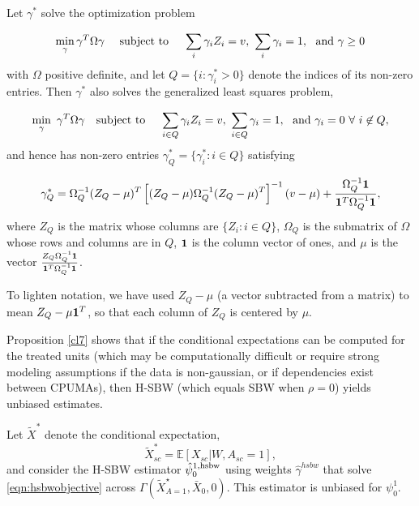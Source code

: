 \begin{proposition}\label{cl56}
Let $\gamma^*$ solve the optimization problem

\begin{equation}\label{eqn:a1.1}
 \min_\gamma \gamma^T \Omega \gamma \quad \text{ subject to } \quad  \sum_i \gamma_i Z_i = v,\ \sum_i \gamma_i = 1,\ \textup{ and } \gamma \geq 0%
\end{equation}
 with $\Omega$ positive definite, and let $Q = \{i: \gamma^*_i > 0\}$ denote the indices of its non-zero entries. Then $\gamma^*$ also solves the generalized least squares problem,
  
  \begin{equation}\label{eqn:a1.2}
   \min_{\gamma}  \ \gamma^T \Omega \gamma  \quad \textup{subject to }\quad \sum_{i \in Q} \gamma_i Z_i = v,\ \sum_{i \in Q} \gamma_i = 1,\ \textup{ and }   \gamma_i = 0\  \forall\ i \not\in Q,
  \end{equation}
 and hence has non-zero entries $\gamma^*_Q = \{\gamma_i^*: i \in Q\}$ satisfying
 
 \begin{equation}\label{eqn:a1.3}
 \gamma^*_{Q} = \Omega_{Q}^{-1} (Z_{Q} - \mu)^T\left[ (Z_Q - \mu) \Omega_{Q}^{-1} (Z_Q - \mu)^T\right]^{-1} (v - \mu) + \frac{\Omega^{-1}_Q {\bf 1} }{{\bf 1}^T \Omega^{-1}_Q {\bf 1}},
 \end{equation}
where $Z_{Q}$ is the matrix whose columns are $\{Z_i: i \in Q\}$, $\Omega_Q$ is the submatrix of $\Omega$ whose rows and columns are in $Q$, ${\bf 1}$ is the column vector of ones, and $\mu$ is the vector $\frac{Z_{Q}\Omega_{Q}^{-1} {\bf 1}}{ {\bf 1}^T \Omega^{-1}_Q {\bf 1}}$. 
\end{proposition}

\begin{remark}
To lighten notation, we have used $Z_Q - \mu$ (a vector subtracted from a matrix) to mean $Z_Q - \mu{\bf 1}^T$, so that each column of $Z_{Q}$ is centered by $\mu$. 
\end{remark}

Proposition \ref{cl7} shows that if the conditional expectations can be computed for the treated units (which may be computationally difficult or require strong modeling assumptions if the data is non-gaussian, or if dependencies exist between CPUMAs), then H-SBW (which equals SBW when $\rho=0$) yields unbiased estimates. 

\begin{proposition}\label{cl7}
    Let $\tilde{X}^*$ denote the conditional expectation,
    \[\tilde{X}^*_{sc} = \mathbb{E}[X_{sc} | W, A_{sc}=1],\]
    and consider the H-SBW estimator $\hat{\psi}_0^{1, \textup{hsbw}}$ using weights $\hat{\gamma}^{hsbw}$ that solve \eqref{eqn:hsbwobjective} across $\Gamma(\tilde{X}^\star_{A=1}, \bar{X}_0, 0)$. This estimator is unbiased for $\psi_0^1$.
\end{proposition}

